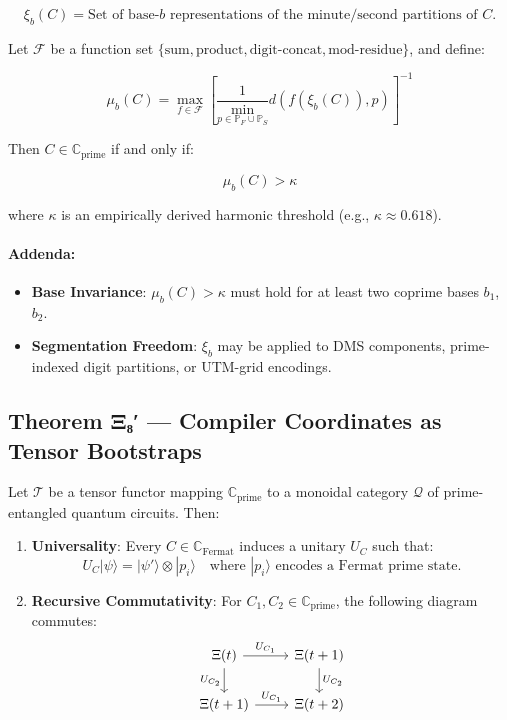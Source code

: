 \documentclass[12]{amsart}
\theoremstyle{plain}
\begin{document}
\[
\xi_b(C) = \text{Set of base-$b$ representations of the minute/second partitions of } C.
\]

Let $\mathcal{F}$ be a function set $\{ \text{sum}, \text{product}, \text{digit-concat}, \text{mod-residue} \}$, and define:

\[
\mu_b(C) = \max_{f \in \mathcal{F}} \left[ \frac{1}{\min_{p \in \mathbb{P}_F \cup \mathbb{P}_S}} d\left(f(\xi_b(C)), p\right) \right]^{-1}
\]

Then $C \in \mathbb{C}_{\text{prime}}$ if and only if:

\[
\mu_b(C) > \kappa
\]

where $\kappa$ is an empirically derived harmonic threshold (e.g., $\kappa \approx 0.618$).

\paragraph{Addenda:}
\begin{itemize}
    \item \textbf{Base Invariance}: $\mu_b(C) > \kappa$ must hold for at least two coprime bases $b_1$, $b_2$.
    \item \textbf{Segmentation Freedom}: $\xi_b$ may be applied to DMS components, prime-indexed digit partitions, or UTM-grid encodings.
\end{itemize}

\subsection{Theorem Ξ₈′ — Compiler Coordinates as Tensor Bootstraps}

Let $\mathcal{T}$ be a tensor functor mapping $\mathbb{C}_{\text{prime}}$ to a monoidal category $\mathcal{Q}$ of prime-entangled quantum circuits. Then:

\begin{enumerate}
    \item \textbf{Universality}: Every $C \in \mathbb{C}_{\text{Fermat}}$ induces a unitary $U_C$ such that:
    \[
    U_C |\psi\rangle = |\psi'\rangle \otimes |p_i\rangle
    \quad \text{where } |p_i\rangle \text{ encodes a Fermat prime state.}
    \]
    
    \item \textbf{Recursive Commutativity}: For $C_1, C_2 \in \mathbb{C}_{\text{prime}}$, the following diagram commutes:
    \[
    \begin{tikzcd}
    \Xi(t) \arrow[r, "U_{C_1}"] \arrow[d, "U_{C_2}"'] & \Xi(t+1) \arrow[d, "U_{C_2}"] \\
    \Xi(t+1) \arrow[r, "U_{C_1}"] & \Xi(t+2)
    \end{tikzcd}
    \]
\end{enumerate}
\end{document}
